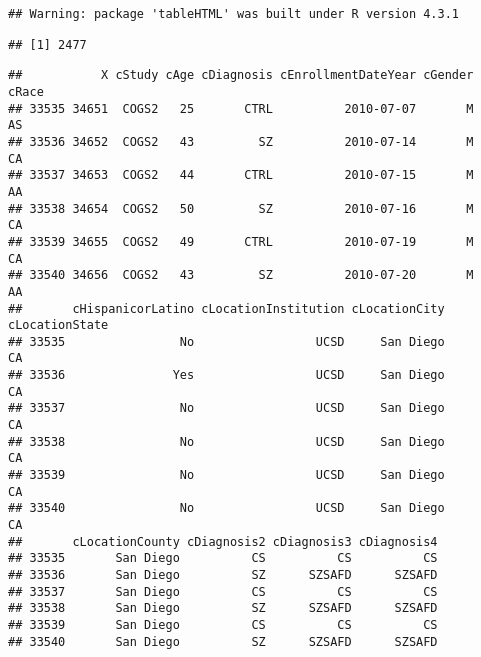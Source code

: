\documentclass[
]{article}
\begin{document}
\begin{verbatim}
## Warning: package 'tableHTML' was built under R version 4.3.1
\end{verbatim}

\begin{verbatim}
## [1] 2477
\end{verbatim}

\begin{verbatim}
##           X cStudy cAge cDiagnosis cEnrollmentDateYear cGender cRace
## 33535 34651  COGS2   25       CTRL          2010-07-07       M    AS
## 33536 34652  COGS2   43         SZ          2010-07-14       M    CA
## 33537 34653  COGS2   44       CTRL          2010-07-15       M    AA
## 33538 34654  COGS2   50         SZ          2010-07-16       M    CA
## 33539 34655  COGS2   49       CTRL          2010-07-19       M    CA
## 33540 34656  COGS2   43         SZ          2010-07-20       M    AA
##       cHispanicorLatino cLocationInstitution cLocationCity cLocationState
## 33535                No                 UCSD     San Diego             CA
## 33536               Yes                 UCSD     San Diego             CA
## 33537                No                 UCSD     San Diego             CA
## 33538                No                 UCSD     San Diego             CA
## 33539                No                 UCSD     San Diego             CA
## 33540                No                 UCSD     San Diego             CA
##       cLocationCounty cDiagnosis2 cDiagnosis3 cDiagnosis4
## 33535       San Diego          CS          CS          CS
## 33536       San Diego          SZ      SZSAFD      SZSAFD
## 33537       San Diego          CS          CS          CS
## 33538       San Diego          SZ      SZSAFD      SZSAFD
## 33539       San Diego          CS          CS          CS
## 33540       San Diego          SZ      SZSAFD      SZSAFD
\end{verbatim}
\end{document}
